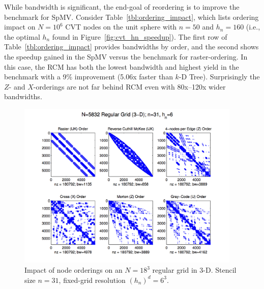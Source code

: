 \documentclass{report}
\begin{document}
While bandwidth is significant, the end-goal of reordering is to improve the benchmark for SpMV. Consider Table~\ref{tbl:ordering_impact}, which lists ordering impact on $N=10^6$ CVT nodes on the unit sphere with $n=50$ and $h_n=160$ (i.e., the optimal $h_n$ found in Figure~\ref{fig:cvt_hn_speedup}). 
The first row of Table~\ref{tbl:ordering_impact} provides bandwidths by order, and the second shows the speedup gained in the SpMV versus the benchmark for raster-ordering. In this case, the RCM has both the lowest bandwidth and highest yield in the benchmark with a 9\% improvement (5.06x faster than $k$-D Tree). Surprisingly the $Z$- and $X$-orderings are not far behind RCM even with 80x--120x wider bandwidths. 

\begin{figure}
\centering
\includegraphics[width=0.95\textwidth]{rbffd_methods_content/hashing/spy_regulargrid_N18d3_n31_hn6.png} 
\caption{Impact of node orderings on an $N=18^3$ regular grid in 3-D. Stencil size $n=31$, fixed-grid resolution $(h_n)^d=6^3$. }
\label{fig:ordering_impact_rg}
\end{figure}
\end{document}
